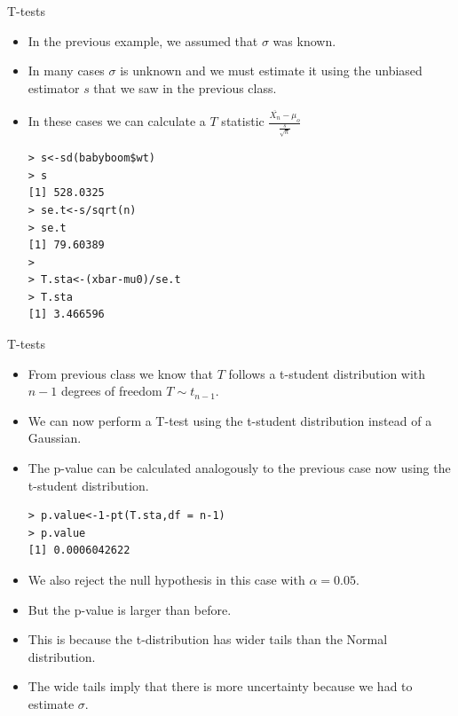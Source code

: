 \documentclass[handout]{beamer}
\begin{document}
\begin{frame}[fragile]{T-tests}
\scriptsize{

 \begin{itemize}
 \item In the previous example, we assumed that $\sigma$ was known.
 \item In many cases  $\sigma$ is unknown and we must estimate it using the unbiased estimator $s$ that we saw in the previous class.
 \item In these cases we can calculate a $T$ statistic $\frac{\overline{X_{n}}-\mu_{o}}{\frac{s}{\sqrt{n}}}$
 \begin{verbatim}
> s<-sd(babyboom$wt)
> s
[1] 528.0325
> se.t<-s/sqrt(n)
> se.t
[1] 79.60389
> 
> T.sta<-(xbar-mu0)/se.t
> T.sta
[1] 3.466596
 \end{verbatim}

 
\end{itemize}


} 
\end{frame}


\begin{frame}[fragile]{T-tests}
\scriptsize{

 \begin{itemize}
 \item From previous class we know that $T$ follows a t-student distribution with $n-1$ degrees of freedom  $T \sim t_{n-1}$.
 \item We can now  perform a T-test using the t-student distribution instead of a Gaussian.
 
 \item The p-value can be calculated analogously to the previous case now using the t-student distribution.
 
  
 \begin{verbatim}
> p.value<-1-pt(T.sta,df = n-1)
> p.value
[1] 0.0006042622
 \end{verbatim}

 \item We also reject the null hypothesis in this case with $\alpha=0.05$.
 \item But the p-value is larger than before.
 \item This is because the t-distribution has wider tails than the Normal distribution.
 \item The wide tails imply that there is more uncertainty because we had to estimate $\sigma$.
\end{itemize}


} 
\end{frame}
\end{document}

